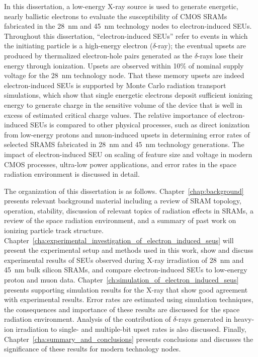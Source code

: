 In this dissertation, a low-energy X-ray source is used to generate energetic, nearly ballistic electrons to evaluate the susceptibility of CMOS SRAMs fabricated in the 28~nm and 45~nm technology nodes to electron-induced SEUs. 
Throughout this dissertation, ``electron-induced SEUs'' refer to events in which the initiating particle is a high-energy electron ($\delta$-ray); the eventual upsets are produced by thermalized electron-hole pairs generated as the $\delta$-rays lose their energy through ionization. 
Upsets are observed within 10\% of nominal supply voltage for the 28~nm technology node. 
That these memory upsets are indeed electron-induced SEUs is supported by Monte Carlo radiation transport simulations, which show that single energetic electrons deposit sufficient ionizing energy to generate charge in the sensitive volume of the device that is well in excess of estimated critical charge values. 
The relative importance of electron-induced SEUs is compared to other physical processes, such as direct ionization from low-energy protons \cite{Rodbell:2007vl, Heidel:2008vf, Heidel:2009vx, Sierawski:2009ka} and muon-induced upsets \cite{Sierawski:2010cj, Sierawski:2011bn} in determining error rates of selected SRAMS fabricated in 28~nm and 45~nm technology generations. 
The impact of electron-induced SEU on scaling of feature size and voltage in modern CMOS processes, ultra-low power applications, and error rates in the space radiation environment is discussed in detail.

The organization of this dissertation is as follows. 
Chapter~\ref{chap:background} presents relevant background material including a review of SRAM topology, operation, stability, discussion of relevant topics of radiation effects in SRAMs, a review of the space radiation environment, and a summary of past work on ionizing particle track structure. 
Chapter~\ref{cha:experimental_investigation_of_electron_induced_seus} will present the experimental setup and methods used in this work, show and discuss experimental results of SEUs observed during X-ray irradiation of 28~nm and 45~nm bulk silicon SRAMs, and compare electron-induced SEUs to low-energy proton and muon data.
Chapter~\ref{ch:simulation_of_electron_induced_seus} presents supporting simulation results for the X-ray that show good agreement with experimental results. Error rates are estimated using simulation techniques, the consequences and importance of these results are discussed for the space radiation environment.
Analysis of the contribution of $\delta$-rays generated in heavy-ion irradiation to single- and multiple-bit upset rates is also discussed.
Finally, Chapter~\ref{cha:summary_and_conclusions} presents conclusions and discusses the significance of these results for modern technology nodes.
